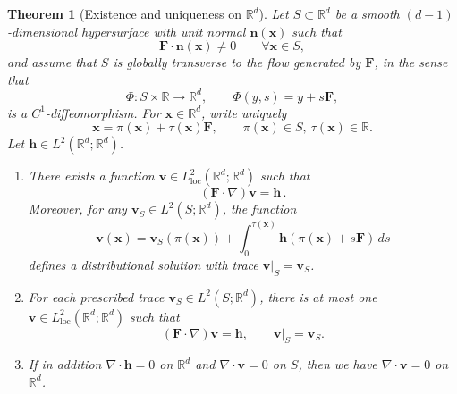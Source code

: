 \documentclass[12pt]{article}
\newtheorem{theorem}{Theorem}
\begin{document}
\begin{theorem}[Existence and uniqueness on $\mathbb{R}^d$]
\label{thm:exist-unique-Rd}
Let $S\subset\mathbb R^d$ be a smooth $(d-1)$-dimensional hypersurface with unit normal
$\boldsymbol n(\boldsymbol x)$ such that
\[
\mathbf F\cdot \boldsymbol n(\boldsymbol x)\neq 0
\qquad \forall \boldsymbol x\in S,
\]
and assume that $S$ is globally transverse to the flow generated by $\mathbf F$, in the sense that
\[
\Phi:S\times\mathbb R\to\mathbb R^d,\qquad \Phi(y,s)=y+s\mathbf F,
\]
is a $C^1$-diffeomorphism. For $\boldsymbol x\in\mathbb R^d$, write uniquely
\[
\boldsymbol x=\pi(\boldsymbol x)+\tau(\boldsymbol x)\mathbf F,\qquad \pi(\boldsymbol x)\in S,\ \tau(\boldsymbol x)\in\mathbb R.
\]
Let $\boldsymbol h\in L^2(\mathbb R^d;\mathbb R^d)$.

\begin{enumerate}
\item[(i)]
There exists a function $\boldsymbol v\in L^2_{\mathrm{loc}}(\mathbb R^d;\mathbb R^d)$ such that {{}
\[
(\mathbf F\cdot\nabla)\boldsymbol v=\boldsymbol h\,.
\]}
Moreover, for any $\boldsymbol v_S\in L^2(S;\mathbb R^d)$, the function
\[
\boldsymbol v(\boldsymbol x)=\boldsymbol v_S(\pi(\boldsymbol x))+\int_{0}^{\tau(\boldsymbol x)}\boldsymbol h(\pi(\boldsymbol x)+s\mathbf F)\,ds
\]
defines a distributional solution with trace $\boldsymbol v|_S=\boldsymbol v_S$.

\item[(ii)]
For each prescribed trace $\boldsymbol v_S\in L^2(S;\mathbb R^d)$, there is at most one
$\boldsymbol v\in L^2_{\mathrm{loc}}(\mathbb R^d;\mathbb R^d)$ such that
\[
(\mathbf F\cdot\nabla)\boldsymbol v={{} \boldsymbol h},
\qquad
\boldsymbol v|_S=\boldsymbol v_S.
\]
\item[(iii)]
If in addition $\nabla\cdot\boldsymbol h=0$ on $\mathbb{R}^d$ and $\nabla\cdot\boldsymbol v= 0$ on $S$,
then we have $\nabla\cdot\boldsymbol v=0$ on $\mathbb{R}^d$.
\end{enumerate}
\end{theorem}
\end{document}
